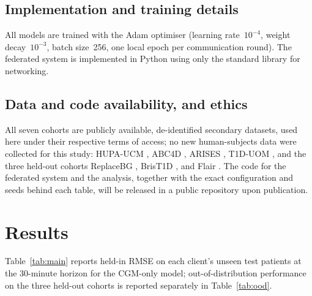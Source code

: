 \documentclass[10pt,letterpaper]{article}
\begin{document}
\subsection*{Implementation and training details}

All models are trained with the Adam optimiser (learning rate~$10^{-4}$, weight
decay~$10^{-3}$, batch size~256, one local epoch per communication round). The
federated system is implemented in Python using only the standard library for
networking.

\subsection*{Data and code availability, and ethics}

All seven cohorts are publicly available, de-identified secondary datasets, used
here under their respective terms of access; no new human-subjects data were
collected for this study: HUPA-UCM \cite{hidalgo2024hupaucm}, ABC4D
\cite{abc4d_nct}, ARISES \cite{zhu2022arises}, T1D-UOM \cite{alsuhaymi2025t1duom},
and the three held-out cohorts ReplaceBG \cite{aleppo2017replacebg}, BrisT1D
\cite{james2025brist1d}, and Flair \cite{jaeb_flair}. The code for the federated
system and the analysis, together with the exact configuration and seeds behind
each table, will be released in a public repository upon publication.

\section*{Results}

Table~\ref{tab:main} reports held-in RMSE on each client's unseen test patients at
the 30-minute horizon for the CGM-only model; out-of-distribution performance on
the three held-out cohorts is reported separately in Table~\ref{tab:ood}.
\end{document}
